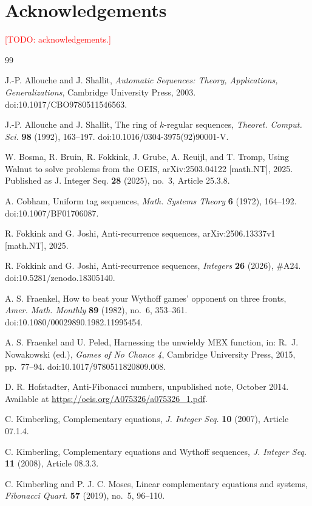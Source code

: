 \documentclass[11pt]{amsart}
\theoremstyle{definition}
\theoremstyle{remark}
\newcommand{\todo}[1]{\textcolor{red}{[TODO: #1]}}
\begin{document}
\section*{Acknowledgements}
\todo{acknowledgements.}

\begin{thebibliography}{99}

J.-P. Allouche and J. Shallit, \emph{Automatic Sequences: Theory, Applications, Generalizations}, Cambridge University Press, 2003. doi:10.1017/CBO9780511546563.

J.-P. Allouche and J. Shallit, The ring of $k$-regular sequences, \emph{Theoret. Comput. Sci.} \textbf{98} (1992), 163--197. doi:10.1016/0304-3975(92)90001-V.

W. Bosma, R. Bruin, R. Fokkink, J. Grube, A. Reuijl, and T. Tromp, Using Walnut to solve problems from the OEIS, arXiv:2503.04122 [math.NT], 2025. Published as J. Integer Seq. \textbf{28} (2025), no.~3, Article 25.3.8.

A. Cobham, Uniform tag sequences, \emph{Math. Systems Theory} \textbf{6} (1972), 164--192. doi:10.1007/BF01706087.

R. Fokkink and G. Joshi, Anti-recurrence sequences, arXiv:2506.13337v1 [math.NT], 2025.

R. Fokkink and G. Joshi, Anti-recurrence sequences, \emph{Integers} \textbf{26} (2026), \#A24. doi:10.5281/zenodo.18305140.

A. S. Fraenkel, How to beat your Wythoff games' opponent on three fronts, \emph{Amer. Math. Monthly} \textbf{89} (1982), no.~6, 353--361. doi:10.1080/00029890.1982.11995454.

A. S. Fraenkel and U. Peled, Harnessing the unwieldy MEX function, in: R.~J. Nowakowski (ed.), \emph{Games of No Chance 4}, Cambridge University Press, 2015, pp.~77--94. doi:10.1017/9780511820809.008.

D. R. Hofstadter, Anti-Fibonacci numbers, unpublished note, October 2014. Available at \url{https://oeis.org/A075326/a075326_1.pdf}.

C. Kimberling, Complementary equations, \emph{J. Integer Seq.} \textbf{10} (2007), Article 07.1.4.

C. Kimberling, Complementary equations and Wythoff sequences, \emph{J. Integer Seq.} \textbf{11} (2008), Article 08.3.3.

C. Kimberling and P. J. C. Moses, Linear complementary equations and systems, \emph{Fibonacci Quart.} \textbf{57} (2019), no.~5, 96--110.


\end{thebibliography}
\end{document}
